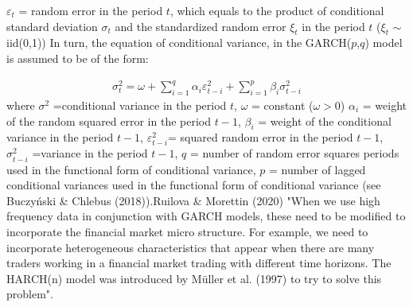 \documentclass[a4paper,11pt,oneside]{book}
\begin{document}
$\varepsilon_t$ = random error in the period $t$, which equals to the
product of conditional standard deviation $\sigma_t$ and  the
standardized random error $\xi_t$ in the period $t$ ($\xi_t$ $\sim$ iid(0,1))
\newline\newline
In turn, the equation of conditional variance, in the GARCH($p$,$q$) model is assumed to be of the form:


\begin{equation}
\begin{aligned}
\sigma^2_t = \omega + \sum_{i=1}^{q}\alpha_{i}\varepsilon^{2}_{t-i} + \sum_{i=1}^{p}\beta_{i} \sigma^2_{t-i}
\label{7}
\end{aligned}
\end{equation}
where $\sigma^2$ =conditional variance in the period $t$,\newline
$\omega$ = constant ($\omega>0$)\newline
$\alpha_{i}$ = weight of the random squared error in the period $t-1$,\newline
$\beta_{i}$ = weight of the conditional variance in the period $t-1$,\newline
$\varepsilon^{2}_{t-i}$= squared random error in the period $t-1$,\newline
$\sigma^2_{t-i}$ =variance in the period $t-1$,\newline
$q$ = number of random error squares periods used in the functional form of conditional variance,\newline
$p$ = number of lagged conditional variances used in the
functional form of conditional variance (see Buczyński \& Chlebus (2018)).\newline\newline Ruilova \& Morettin (2020) "When we use high frequency data in conjunction with GARCH models, these need to be modified
to incorporate the financial market micro structure. For example, we need to incorporate heterogeneous
characteristics that appear when there are many traders working in a financial market trading with
different time horizons. The HARCH(n) model was introduced by Müller et al. (1997) to try to solve this problem".
\end{document}
